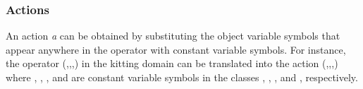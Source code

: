 \subsubsection{Actions}
An action \textit{a} can be obtained by substituting the object variable symbols that
appear anywhere in the operator with constant variable symbols. For instance, the operator (,,,) in the kitting domain can be translated into the action (,,,) where , , , and  are constant variable symbols in the classes , , , and , respectively.





